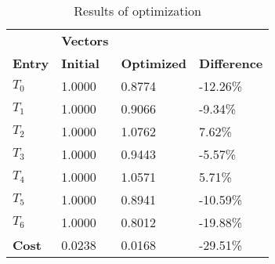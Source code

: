\begin{table}[h!]
\centering
\begin{tabular}{llll}
\textbf{}      & \cellcolor[HTML]{EFEFEF}\textbf{Vectors} & \textbf{} & \textbf{}         \\
\rowcolor[HTML]{EFEFEF} 
\textbf{Entry} & \textbf{Initial} & \textbf{Optimized} & \textbf{Difference} \\
$T_0$ & 1.0000 & 0.8774 & -12.26\% \\ 
$T_1$ & 1.0000 & 0.9066 & -9.34\% \\ 
$T_2$ & 1.0000 & 1.0762 & 7.62\% \\ 
$T_3$ & 1.0000 & 0.9443 & -5.57\% \\ 
$T_4$ & 1.0000 & 1.0571 & 5.71\% \\ 
$T_5$ & 1.0000 & 0.8941 & -10.59\% \\ 
$T_6$ & 1.0000 & 0.8012 & -19.88\% \\ 
\rowcolor[HTML]{EFEFEF} 
\textbf{Cost}  & 0.0238 & 0.0168 & -29.51\% \\ 
\end{tabular}
\caption{Results of optimization}
\label{tab:OptimizationAnalysis}
\end{table}